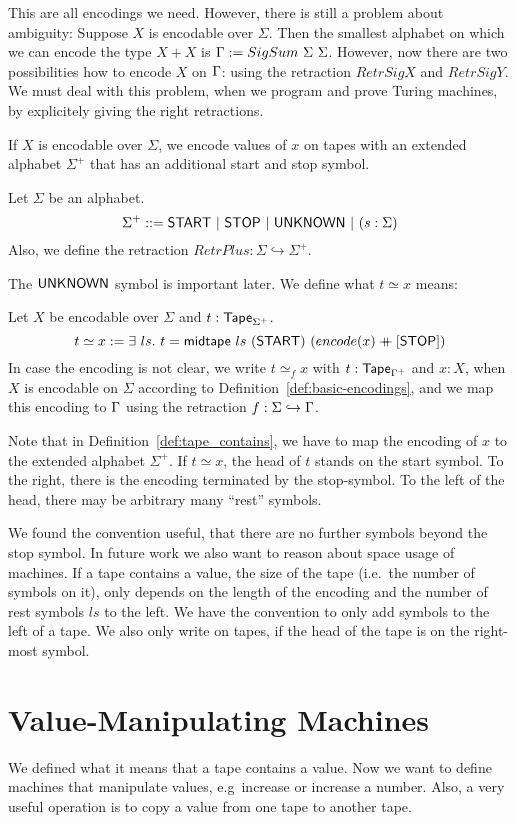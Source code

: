 This are all encodings we need.  However, there is still a problem about ambiguity: Suppose $X$ is encodable over $\Sigma$.  Then the smallest
alphabet on which we can encode the type $X+X$ is $\Gamma := SigSum~\Sigma~\Sigma$.  However, now there are two possibilities how to encode $X$ on
$\Gamma$: using the retraction $RetrSigX$ and $RetrSigY$.  We must deal with this problem, when we program and prove Turing machines, by explicitely
giving the right retractions.

If $X$ is encodable over $\Sigma$, we encode values of $x$ on tapes with an extended alphabet $\Sigma^+$ that has an additional start and stop symbol.
\begin{definition}[$\Sigma^+$] Let $\Sigma$ be an alphabet.
  \[
    \Sigma^+ ::= \textsf{START} ~|~ \textsf{STOP} ~|~ \textsf{UNKNOWN} ~|~ (s: \Sigma)
  \]
  Also, we define the retraction $RetrPlus : \Sigma \hookrightarrow \Sigma^+$.
\end{definition}
The $\textsf{UNKNOWN}$ symbol is important later. We define what $t \simeq x$ means:
\begin{definition}[$t \simeq x$]
  \label{def:tape_contains}
  Let $X$ be encodable over $\Sigma$ and $t : \textsf{Tape}_{\Sigma^+}$.
  \[
    t \simeq x := \exists~ls.~
    t = \textsf{midtape}~ls~(\textsf{START})~(encode(x) \mathbin{+\mkern-10mu+} [\textsf{STOP}])
  \]
  In case the encoding is not clear, we write $t \simeq_{f} x$ with $t:\textsf{Tape}_{\Gamma^+}$ and $x:X$, when $X$ is encodable on $\Sigma$ according to
  Definition~\ref{def:basic-encodings}, and we map this encoding to $\Gamma$ using the retraction $f: \Sigma \hookrightarrow \Gamma$.
\end{definition}

Note that in Definition~\ref{def:tape_contains}, we have to map the encoding of $x$ to the extended alphabet $\Sigma^+$.  If $t \simeq x$, the head of
$t$ stands on the start symbol.  To the right, there is the encoding terminated by the stop-symbol.  To the left of the head, there may be arbitrary
many ``rest'' symbols.

We found the convention useful, that there are no further symbols beyond the stop symbol.  In future work we also want to reason about space usage of
machines.  If a tape contains a value, the size of the tape (i.e.\ the number of symbols on it), only depends on the length of the encoding and the
number of rest symbols $ls$ to the left.  We have the convention to only add symbols to the left of a tape.  We also only write on tapes, if the head
of the tape is on the right-most symbol.

\section{Value-Manipulating Machines}
\label{sec:value-manipulate}


We defined what it means that a tape contains a value.  Now we want to define machines that manipulate values, e.g\ increase or increase a number.
Also, a very useful operation is to copy a value from one tape to another tape.









